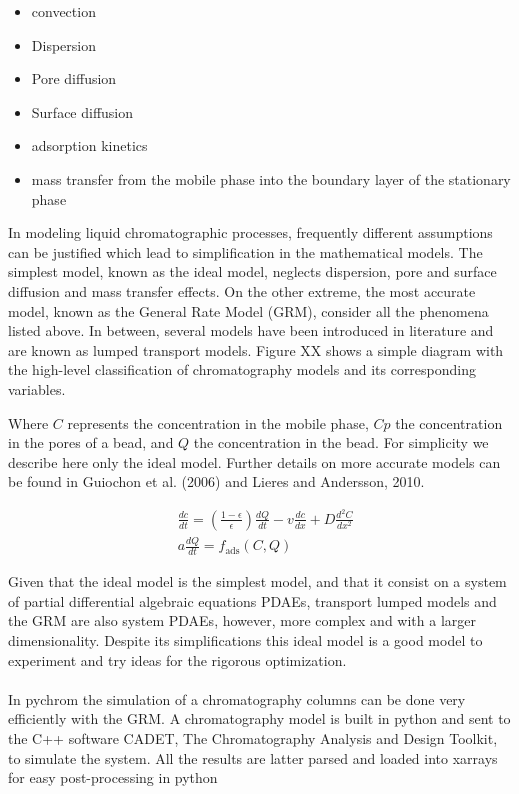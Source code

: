 \documentclass[paper=a4, fontsize=11pt]{scrartcl}
\begin{document}
\begin{itemize}
\item convection
\item Dispersion
\item Pore diffusion
\item Surface diffusion
\item adsorption kinetics
\item mass transfer from the mobile phase into the boundary layer of the stationary phase
\end{itemize}

In modeling liquid chromatographic processes, frequently different assumptions can be justified which lead to simplification in the mathematical models. The simplest model, known as the ideal model, neglects dispersion, pore and surface diffusion and mass transfer effects. On the other extreme, the most accurate model, known as the General Rate Model (GRM), consider all the phenomena listed above. In between, several models have been introduced in literature and are known as lumped transport models. Figure XX shows a simple diagram with the high-level classification of chromatography models and its corresponding variables.

Where $C$ represents the concentration in the mobile phase, $Cp$ the concentration in the pores of a bead, and $Q$ the concentration in the bead. For simplicity we describe here only the ideal model. Further details on more accurate models can be found in Guiochon et al. (2006) and Lieres and Andersson, 2010.

\begin{align}
& \frac{dc}{dt} = \left(\frac{1-\epsilon}{\epsilon}\right) \frac{dQ}{dt}-v\frac{dc}{dx} + D\frac{d^2C}{dx^2}\\
& a \frac{dQ}{dt} = f_{\text{ads}}(C,Q)
\end{align}

Given that the ideal model is the simplest model, and that it consist on a system of partial differential algebraic equations PDAEs, transport lumped models and the GRM are also system PDAEs, however, more complex and with a larger dimensionality. Despite its simplifications this ideal model is a good model to experiment and try ideas for the rigorous optimization.  
\\
\\
In pychrom the simulation of a chromatography columns can be done very efficiently with the GRM. A chromatography model is built in python and sent to the C++ software CADET, The Chromatography Analysis and Design Toolkit, to simulate the system. All the results are latter parsed and loaded into xarrays for easy post-processing in python
 

\end{document}
